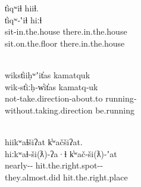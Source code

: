 \begin{exe}
  \ex\label{ex:3.14}
  \begin{xlist}

    \ex\label{ex:3.14a}
    \glllll  t̓iqʷiɬ           hiiɬ.\\
             t̓iqʷ‑ʽiɬ         hiːɬ\\
             sit‑in.the.house there.in.the.house\\
             sit.on.the.floor there.in.the.house\\
                     
             \\

    \ex\label{ex:3.14b}
    \glllll wikst̓iiḥʷʼit̓as              kamatquk\\
            wik‑st̓iːḥ‑w̓it̓as             kamatq‑uk\\
            not‑take.direction‑about.to running‑\\
            without.taking.direction    be.running\\
                               \\

    \ex\label{ex:3.14c}
    \glllll hiikʷaɬšiʔat            k̓ʷačšiʔat.\\
            hiːkʷaɬ‑ši(ƛ)‑ʔa·ɬ      k̓ʷač‑ši(ƛ)‑ʼat\\
            nearly‑‑ hit.the.right.spot‑‑\\
            they.almost.did         hit.the.right.place\\
                           \\

  \end{xlist}
\end{exe}

